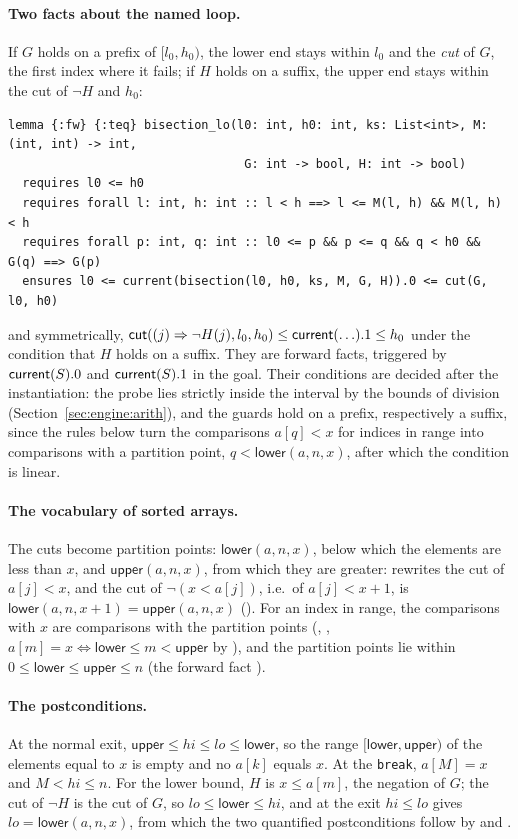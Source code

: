 \paragraph{Two facts about the named loop.} If $G$ holds on a prefix of $[l_0, h_0)$, the lower end stays within $l_0$
and the \emph{cut} of $G$, the first index where it fails; if $H$ holds on a suffix, the upper end stays within the
cut of $\neg H$ and $h_0$:
\begin{lstlisting}
lemma {:fw} {:teq} bisection_lo(l0: int, h0: int, ks: List<int>, M: (int, int) -> int,
                                 G: int -> bool, H: int -> bool)
  requires l0 <= h0
  requires forall l: int, h: int :: l < h ==> l <= M(l, h) && M(l, h) < h
  requires forall p: int, q: int :: l0 <= p && p <= q && q < h0 && G(q) ==> G(p)
  ensures l0 <= current(bisection(l0, h0, ks, M, G, H)).0 <= cut(G, l0, h0)
\end{lstlisting}
and  symmetrically, $\mathsf{cut}((j) \Rightarrow \neg H(j), l_0, h_0) \le \mathsf{current}(\ldots).1 \le h_0$
under the condition that $H$ holds on a suffix. They are forward facts, triggered by $\mathsf{current}(S).0$ and $\mathsf{current}(S).1$ in the
goal. Their conditions are decided after the instantiation: the probe lies strictly inside the interval by the
bounds of division (Section~\ref{sec:engine:arith}), and the guards hold on a prefix, respectively a suffix, since
the rules below turn the comparisons $a[q] < x$ for indices in range into comparisons with a partition point,
$q < \mathsf{lower}(a, n, x)$, after which the condition is linear.

\paragraph{The vocabulary of sorted arrays.} The cuts become partition points:
$\mathsf{lower}(a, n, x)$, below which the elements are less than $x$, and $\mathsf{upper}(a, n, x)$, from which
they are greater:  rewrites the cut of $a[j] < x$, and the cut of $\neg(x < a[j])$, i.e.\ of
$a[j] < x + 1$, is $\mathsf{lower}(a, n, x + 1) = \mathsf{upper}(a, n, x)$ (). For an index in range,
the comparisons with $x$ are comparisons with the partition points (, ,
$a[m] = x \Leftrightarrow \mathsf{lower} \le m < \mathsf{upper}$ by ), and the partition points lie within
$0 \le \mathsf{lower} \le \mathsf{upper} \le n$ (the forward fact ).

\paragraph{The postconditions.} At the normal exit, $\mathsf{upper} \le hi \le lo \le \mathsf{lower}$, so the range
$[\mathsf{lower}, \mathsf{upper})$ of the elements equal to $x$ is empty and no $a[k]$ equals $x$. At the
\texttt{break}, $a[M] = x$ and $M < hi \le n$. For the lower bound, $H$ is $x \le a[m]$, the negation of $G$; the cut
of $\neg H$ is the cut of $G$, so $lo \le \mathsf{lower} \le hi$, and at the exit $hi \le lo$ gives
$lo = \mathsf{lower}(a, n, x)$, from which the two quantified postconditions follow by  and
.

